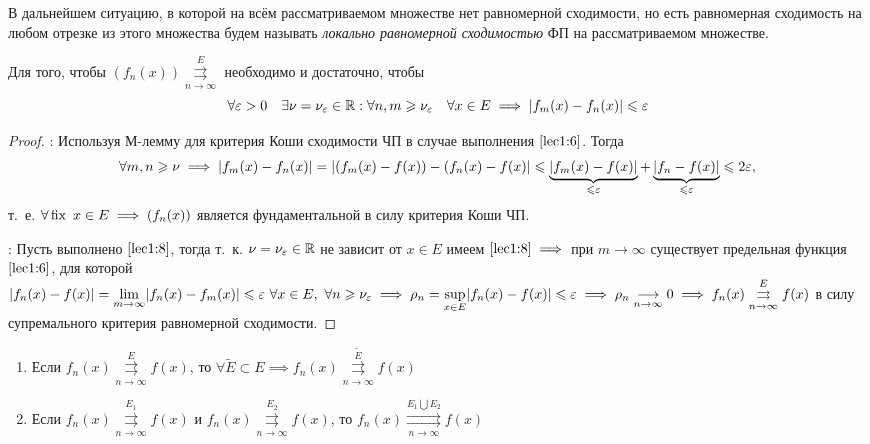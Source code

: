 \documentclass[../../main.tex]{subfiles}
\begin{document}
В дальнейшем ситуацию, в которой на всём рассматриваемом 
множестве нет равномерной сходимости, но есть равномерная 
сходимость на любом отрезке из этого множества будем называть 
\emph{локально равномерной сходимостью} ФП на рассматриваемом множестве.

\begin{thm}
Для того, чтобы $(f_n(x)) \overset{E}
{\underset{n \to \infty}\rightrightarrows}$ необходимо и достаточно, 
чтобы 
\begin{equation}
\label{lec1:8}
\forall \varepsilon > 0 \quad \exists \nu=\nu_\varepsilon \in \mathbb{R} :
\forall n,m \geqslant \nu_\varepsilon \quad \forall x \in E \implies 
|f_m(x) - f_n(x)| \leqslant \varepsilon
\end{equation}
\end{thm}	

\begin{proof}
\;

\nec: Используя М-лемму для критерия Коши сходимости ЧП 
в случае выполнения $\eqref{lec1:6}$. Тогда
\[\forall m, n \geqslant \nu \implies |f_m(x) - f_n(x)| = 
|(f_m(x) - f(x)) - (f_n(x) - f(x)| \leqslant 
\underbrace{|f_m(x) - f(x)|}_{\leqslant \varepsilon} + 
\underbrace{|f_n - f(x)|}_{\leqslant \varepsilon} \leqslant  2\varepsilon,\] т.~е. 
$\forall \operatorname{fix} \ x \in E \implies (f_n(x))$ 
является фундаментальной в силу критерия Коши ЧП.

\suff: Пусть выполнено $\eqref{lec1:8}$, тогда т.~к. $\nu=\nu_\varepsilon \in \mathbb{R}$
не зависит от $x \in E$ имеем $\eqref{lec1:8} \implies$ при $m \to \infty$ 
существует предельная функция 
$\eqref{lec1:6}$, для которой $|f_n(x) - f(x)| = 
\underset{m \to \infty}{\lim} |f_n(x) - f_m(x)| \leq  \eps \ 
\forall x \in E,\ \forall n \geq \nu_\eps \implies \rho_n = 
\underset{x \in E}{\sup} |f_n(x) - f(x)| \leq \eps \implies 
\rho_n \underset{n \to \infty}{\longrightarrow} 0 \implies
f_n(x) \overset{E}
{\underset{n \to \infty}\rightrightarrows} f(x)$
в силу супремального критерия равномерной сходимости. 
\end{proof}	

\begin{rem}
	\;
	
	\begin{enumerate}
		\item Если $f_n(x) \overset{E}
{\underset{n \to \infty}\rightrightarrows} f(x)$, то 
$\forall \widetilde{E} \subset E \implies f_n(x) \overset{\widetilde{E}}
{\underset{n \to \infty}\rightrightarrows} f(x)$
		\item Если $f_n(x) \overset{E_1}
		{\underset{n \to \infty}\rightrightarrows} f(x)$ и 
		$f_n(x) \overset{E_2}
		{\underset{n \to \infty}\rightrightarrows} f(x)$, то
		$f_n(x) \overset{E_1 \bigcup E_2}
		{\underset{n \to \infty}\rightrightarrows} f(x)$
	\end{enumerate}
\end{rem}	
\end{document}
